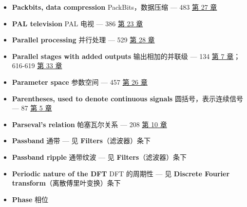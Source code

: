 \begin{itemize}
\tightlist
\item
  \textbf{Packbits, data compression} PackBits，数据压缩 --- 483
   \hyperref[ch-27]{第 27 章}
\item
  \textbf{PAL television} PAL 电视 --- 386 
  \hyperref[ch-23]{第 23 章}
\item
  \textbf{Parallel processing} 并行处理 --- 529 
  \hyperref[ch-28]{第 28 章}
\item
  \textbf{Parallel stages with added outputs} 输出相加的并联级 --- 134
   \hyperref[ch-07]{第 7 章}；616-619 
  \hyperref[ch-33]{第 33 章}
\item
  \textbf{Parameter space} 参数空间 --- 457 
  \hyperref[ch-26]{第 26 章}
\item
  \textbf{Parentheses, used to denote continuous signals}
  圆括号，表示连续信号 --- 87  \hyperref[ch-05]{第 5 章}
\item
  \textbf{Parseval's relation} 帕塞瓦尔关系 --- 208 
  \hyperref[ch-10]{第 10 章}
\item
  \textbf{Passband} 通带 --- 见 \textbf{Filters}（滤波器）条下
\item
  \textbf{Passband ripple} 通带纹波 --- 见
  \textbf{Filters}（滤波器）条下
\item
  \textbf{Periodic nature of the DFT} DFT 的周期性 --- 见
  \textbf{Discrete Fourier transform}（离散傅里叶变换）条下
\item
  \textbf{Phase} 相位


\end{itemize}
